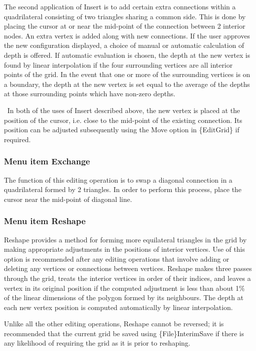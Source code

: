 \documentclass{article}
\begin{document}
The second application of Insert is to add certain extra connections within a quadrilateral consisting of two triangles sharing a common side. This is done by placing the cursor at or near the mid-point of the connection between 2 interior nodes. An extra vertex is added along with new connections. If the user approves the new configuration displayed, a choice of manual or automatic calculation of depth is offered. If automatic evaluation is chosen, the depth at the new vertex is found by linear interpolation if the four surrounding vertices are all interior points of the grid. In the event that one or more of the surrounding vertices is on a boundary, the depth at the new vertex is set equal to the average of the depths at those surrounding points which have non-zero depths.

\ In both of the uses of Insert described above, the new vertex is placed at the position of the cursor, i.e. close to the mid-point of the existing connection. Its position can be adjusted subsequently using the Move option in \{EditGrid\} if required.

\subsubsection[Menu item Exchange]{Menu item Exchange}
The function of this editing operation is to swap a diagonal connection in a quadrilateral formed by 2 triangles. In order to perform this process, place the cursor near the mid-point of diagonal line.

\subsubsection[Menu item Reshape]{Menu item Reshape}
Reshape provides a method for forming more equilateral triangles in the grid by making appropriate adjustments in the positions of interior vertices. Use of this option is recommended after any editing operations that involve adding or deleting any vertices or connections between vertices. Reshape makes three passes through the grid, treats the interior vertices in order of their indices, and leaves a vertex in its original position if the computed adjustment is less than about 1\% of the linear dimensions of the polygon formed by its neighbours. The depth at each new vertex position is computed automatically by linear interpolation.

Unlike all the other editing operations, Reshape cannot be reversed; it is recommended that the current grid be saved using \{File\}InterimSave if there is any likelihood of requiring the grid as it is prior to reshaping.
\end{document}
